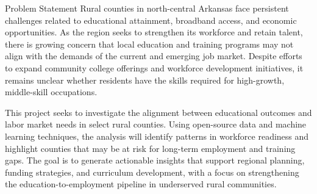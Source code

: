 Problem Statement
Rural counties in north-central Arkansas face persistent challenges related to educational attainment, broadband access, and economic opportunities. As the region seeks to strengthen its workforce and retain talent, there is growing concern that local education and training programs may not align with the demands of the current and emerging job market. Despite efforts to expand community college offerings and workforce development initiatives, it remains unclear whether residents have the skills required for high-growth, middle-skill occupations.

This project seeks to investigate the alignment between educational outcomes and labor market needs in select rural counties. Using open-source data and machine learning techniques, the analysis will identify patterns in workforce readiness and highlight counties that may be at risk for long-term employment and training gaps. The goal is to generate actionable insights that support regional planning, funding strategies, and curriculum development, with a focus on strengthening the education-to-employment pipeline in underserved rural communities.

